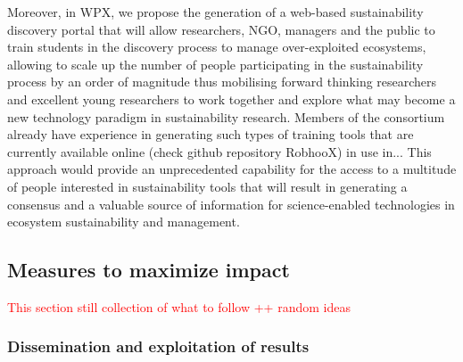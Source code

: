 \documentclass[11pt, a4paper]{article} %
\begin{document}
{\begin{itemize}
  Moreover, in WPX, we propose the generation of a web-based
  sustainability discovery portal that will allow researchers, NGO,
  managers and the public to train students in the discovery process
  to manage over-exploited ecosystems, allowing to scale up the number
  of people participating in the sustainability process by an order of
  magnitude thus mobilising forward thinking researchers and excellent
  young researchers to work together and explore what may become a new
  technology paradigm in sustainability research. Members of the
  consortium already have experience in generating such types of
  training tools that are currently available online (check github
  repository RobhooX) in use in... This approach would provide an
  unprecedented capability for the access to a multitude of people
  interested in sustainability tools that will result in generating a
  consensus and a valuable source of information for science-enabled
  technologies in ecosystem sustainability and management.
\end{itemize}
 
  
\subsection{Measures to maximize impact} 
\label{sec:maximize-impact}

\textcolor{red}{This section still collection of what to follow ++
  random ideas}

\subsubsection{Dissemination and exploitation of results}

}
\end{document}
